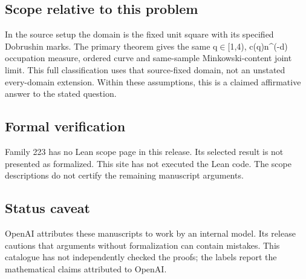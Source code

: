 \documentclass[11pt]{article}
\begin{document}
\subsection{Scope relative to this problem}
In the source setup the domain is the fixed unit square with its specified Dobrushin marks. The primary theorem gives the same q\(\in\)[1,4), c(q)n\textasciicircum{}(-d) occupation measure, ordered curve and same-sample Minkowski-content joint limit. This full classification uses that source-fixed domain, not an unstated every-domain extension. Within these assumptions, this is a claimed affirmative answer to the stated question.

\subsection{Formal verification}
Family 223 has no Lean scope page in this release. Its selected result is not presented as formalized. This site has not executed the Lean code. The scope descriptions do not certify the remaining manuscript arguments.

\subsection{Status caveat}
OpenAI attributes these manuscripts to work by an internal model. Its release cautions that arguments without formalization can contain mistakes. This catalogue has not independently checked the proofs; the labels report the mathematical claims attributed to OpenAI.
\end{document}
